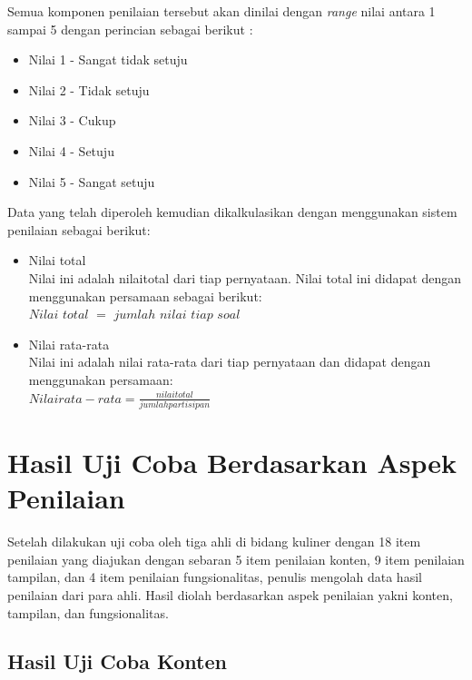 		Semua komponen penilaian tersebut akan dinilai dengan \textit{range} nilai antara 1 sampai 5 dengan perincian sebagai berikut \cite{ardi}:
		\begin{itemize}
			\item Nilai 1 - Sangat tidak setuju
			\item Nilai 2 - Tidak setuju
			\item Nilai 3 - Cukup
			\item Nilai 4 - Setuju
			\item Nilai 5 - Sangat setuju
		\end{itemize}
		Data yang telah diperoleh kemudian dikalkulasikan dengan menggunakan sistem penilaian sebagai berikut:
		\begin{itemize}
			\item Nilai total\\
			Nilai ini adalah nilaitotal dari tiap pernyataan. Nilai total ini didapat dengan menggunakan persamaan sebagai berikut:\\
			$Nilai$ $total$ $=$ $jumlah$ $nilai$ $tiap$ $soal$
			\item Nilai rata-rata\\
			Nilai ini adalah nilai rata-rata dari tiap pernyataan dan didapat dengan menggunakan persamaan:\\
			$Nilai  rata-rata = \frac{nilai total}{jumlah partisipan}$
		\end{itemize}
	
	\section{Hasil Uji Coba Berdasarkan Aspek Penilaian}		
		Setelah dilakukan uji coba oleh tiga ahli di bidang kuliner dengan 18 item penilaian yang diajukan dengan sebaran 5 item penilaian konten, 9 item penilaian tampilan, dan 4 item penilaian fungsionalitas, penulis mengolah data hasil penilaian dari para ahli. Hasil diolah berdasarkan aspek penilaian yakni konten, tampilan, dan fungsionalitas.
		
		\subsection{Hasil Uji Coba Konten}
		
